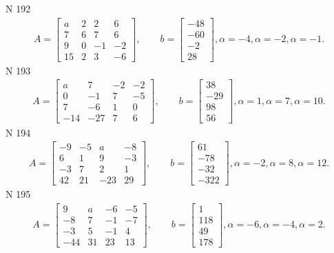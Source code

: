 \documentclass[11pt]{report}
\begin{document}
N 192
\begin{align*}
 A = \left[\begin{matrix}a & 2 & 2 & 6\\7 & 6 & 7 & 6\\9 & 0 & -1 & -2\\15 & 2 & 3 & -6\end{matrix}\right],
    \qquad b = \left[\begin{matrix}-48\\-60\\-2\\28\end{matrix}\right], \alpha = -4, \alpha = -2, \alpha = -1. 
 \end{align*}
N 193
\begin{align*}
 A = \left[\begin{matrix}a & 7 & -2 & -2\\0 & -1 & 7 & -5\\7 & -6 & 1 & 0\\-14 & -27 & 7 & 6\end{matrix}\right],
    \qquad b = \left[\begin{matrix}38\\-29\\98\\56\end{matrix}\right], \alpha = 1, \alpha = 7, \alpha = 10. 
 \end{align*}
N 194
\begin{align*}
 A = \left[\begin{matrix}-9 & -5 & a & -8\\6 & 1 & 9 & -3\\-3 & 7 & 2 & 1\\42 & 21 & -23 & 29\end{matrix}\right],
    \qquad b = \left[\begin{matrix}61\\-78\\-32\\-322\end{matrix}\right], \alpha = -2, \alpha = 8, \alpha = 12. 
 \end{align*}
N 195
\begin{align*}
 A = \left[\begin{matrix}9 & a & -6 & -5\\-8 & 7 & -1 & -7\\-3 & 5 & -1 & 4\\-44 & 31 & 23 & 13\end{matrix}\right],
    \qquad b = \left[\begin{matrix}1\\118\\49\\178\end{matrix}\right], \alpha = -6, \alpha = -4, \alpha = 2. 
 \end{align*}
\end{document}
